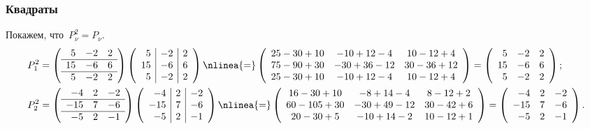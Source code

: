 \begin{solution}
	\subsubsection{Квадраты}
		Покажем, что~$P_\nu^2 = P_\nu$.
		\begin{align*}
			P_1^2 &=
			\left(
				\begin{array}{rrr}
					5 & -2 & 2
					\\
					\hline
					15 & -6 & 6
					\\
					\hline
					5 & -2 & 2
				\end{array}
			\right)
			\left(
				\begin{array}{r|r|r}
					5 & -2 & 2
					\\
					15 & -6 & 6
					\\
					5 & -2 & 2
				\end{array}
			\right)
			\nlinea{=}
			\left(
				\begin{array}{ccc}
					25 - 30 + 10 &
					-10 + 12 - 4 &
					10 - 12 + 4
					\\
					75 - 90 + 30 &
					-30 + 36 - 12 &
					 30 - 36 + 12
					\\
					25 - 30 + 10 &
					-10 + 12 - 4 &
					10 - 12 + 4
				\end{array}
			\right)
			=
			\left(
				\begin{array}{rrr}
					5 & -2 & 2
					\\
					15 & -6 & 6
					\\
					5 & -2 & 2
				\end{array}
			\right)
			;
			\\
			P_2^2 &=
			\left(
				\begin{array}{rrr}
					-4 & 2 & -2
					\\
					\hline
					-15 & 7 & -6
					\\
					\hline
					-5 & 2 & -1
				\end{array}
			\right)
			\left(
				\begin{array}{r|r|r}
					-4 & 2 & -2
					\\
					-15 & 7 & -6
					\\
					-5 & 2 & -1
				\end{array}
			\right)
			\nlinea{=}
			\left(
				\begin{array}{ccc}
					16 - 30 + 10 &
					-8 + 14 - 4 &
					8 -12 + 2
					\\
					60 - 105 + 30 &
					-30 + 49 - 12 &
					30 - 42 + 6
					\\
					20 - 30 + 5 &
					-10 + 14 - 2 &
					10 - 12 + 1
				\end{array}
			\right)
			=
			\left(
				\begin{array}{rrr}
					-4 & 2 & -2
					\\
					-15 & 7 & -6
					\\
					-5 & 2 & -1
				\end{array}
			\right)
			.
		\end{align*}


\end{solution}
